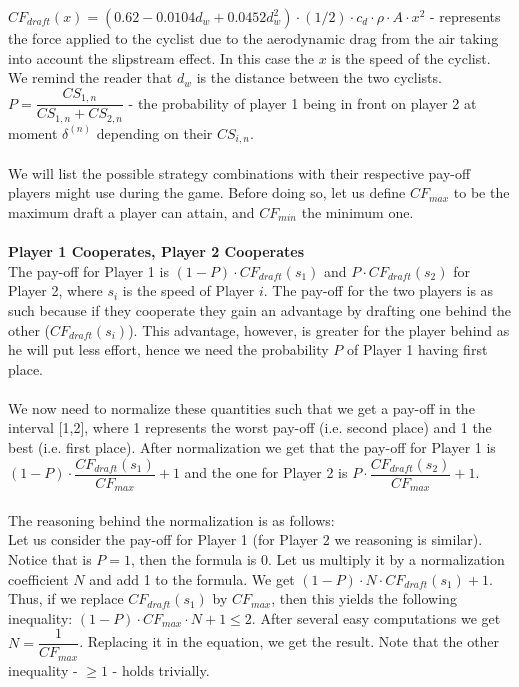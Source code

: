 \documentclass[10pt, a4paper]{report}
\begin{document}
$CF_{draft}(x)=(0.62 - 0.0104d_w + 0.0452 d_w^2)\cdot (1/2)\cdot c_d\cdot \rho\cdot A\cdot x^2$ -  represents the force applied to the cyclist due to the aerodynamic drag from the air taking into account the slipstream effect. In this case the $x$ is the speed of the cyclist. We remind the reader that $d_w$ is the distance between the two cyclists.
$P = \dfrac{CS_{1,n}}{CS_{1,n}+CS_{2,n}}$ - the probability of player 1 being in front on player 2 at moment $\delta^{(n)}$ depending on their $CS_{i,n}$.
\\\\
We will list the possible strategy combinations with their respective pay-off players might use during the game. Before doing so, let us define $CF_{max}$ to be the maximum draft a player can attain, and $CF_{min}$ the minimum one.
\\\\
\textbf{Player 1 Cooperates, Player 2 Cooperates}
\\
The pay-off for Player 1 is $(1-P)\cdot CF_{draft}(s_1)$ and $P \cdot CF_{draft}(s_2)$ for Player 2, where $s_i$ is the speed of Player $i$. The pay-off for the two players is as such because if they cooperate they gain an advantage by drafting one behind the other ($CF_{draft}(s_i)$). This advantage, however, is greater for the player behind as he will put less effort, hence we need the probability $P$ of Player 1 having first place.
\\\\
We now need to normalize these quantities such that we get a pay-off in the interval [1,2], where 1 represents the worst pay-off (i.e. second place) and 1 the best (i.e. first place). After normalization we get that the pay-off for Player 1 is $(1-P)\cdot \dfrac{CF_{draft}(s_1)}{CF_{max}} + 1$ and the one for Player 2 is $P\cdot \dfrac{CF_{draft}(s_2)}{CF_{max}} + 1$.
\\\\
The reasoning behind the normalization is as follows:\\
Let us consider the pay-off for Player 1 (for Player 2 we reasoning is similar). Notice that is $P=1$, then the formula is 0. Let us multiply it by a normalization coefficient $N$ and add 1 to the formula. We get $(1-P)\cdot N\cdot CF_{draft}(s_1)  + 1$. Thus, if we replace $CF_{draft}(s_1)$ by $CF_{max}$, then this yields the following inequality: $(1-P)\cdot CF_{max} \cdot N + 1\le 2$. After several easy computations we get $N = \dfrac{1}{CF_{max}}$. Replacing it in the equation, we get the result. Note that the other inequality - $\ge 1$ - holds trivially.
\end{document}
